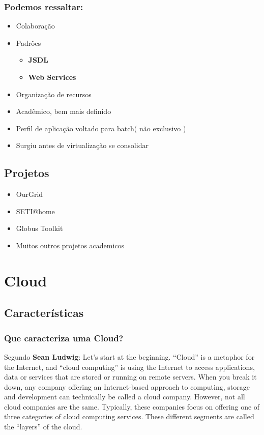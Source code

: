 \documentclass[10pt]{beamer}
\begin{document}
		\begin{frame}%
		\frametitle{Podemos ressaltar:}
			\begin{itemize}%
				\item Colaboração
				\item Padrões
				\begin{itemize}%
					\item \textbf{JSDL}
					\item \textbf{Web Services}
				\end{itemize}
				\item Organização de recursos
				\item Acadêmico, bem mais definido
				\item Perfil de aplicação voltado para batch( não exclusivo )
				\item Surgiu antes de virtualização se consolidar
			\end{itemize}
		\end{frame}

	\subsection{Projetos}

		\begin{frame}%
			\begin{itemize}%
				\item OurGrid
				\item SETI@home
				\item Globus Toolkit
				\item Muitos outros projetos academicos
			\end{itemize}
		\end{frame}

\section{Cloud}
	\subsection{Características}

		\begin{frame}
		\frametitle{Que caracteriza uma Cloud?}
			\begin{block}{Segundo \textbf{Sean Ludwig}:}
				Let’s start at the beginning. “Cloud” is a metaphor for the Internet, and “cloud computing” is using the Internet to access applications, data or services that are stored or running on remote servers.
\newline
\newline
				When you break it down, any company offering an Internet-based approach to computing, storage and development can technically be called a cloud company. However, not all cloud companies are the same. Typically, these companies focus on offering one of three categories of cloud computing services. These different segments are called the “layers” of the cloud.
			\end{block}
		\end{frame}
\end{document}

